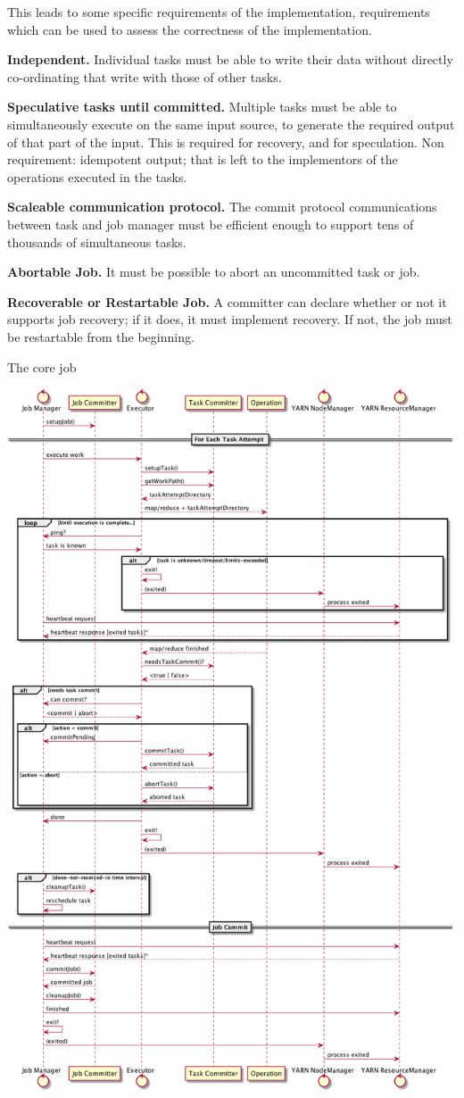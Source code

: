 \documentclass[9pt,technote]{IEEEtran}
\begin{document}
This leads to some specific requirements of the implementation, requirements
which can be used to assess the correctness of the implementation.

\textbf{Independent.}
Individual tasks must be able to write their data without directly
co-ordinating that write with those of other tasks.

\textbf{Speculative tasks until committed.}
Multiple tasks must be able to simultaneously execute on the same input
source, to generate the required output of that part of the input.
This is required for recovery, and for speculation.
Non requirement: idempotent output;
that is left to the implementors of the operations executed in the tasks.

\textbf{Scaleable communication protocol.}
The commit protocol communications between task and job manager
must be efficient enough to support tens of thousands of simultaneous
tasks.

\textbf{Abortable Job.}
It must be possible to abort an uncommitted task or job.

\textbf{Recoverable or Restartable Job.}
A committer can declare whether or not it supports job recovery;
if it does, it must implement recovery.
If not, the job must be restartable from the beginning.

The core job


\includegraphics[width=.8\textwidth]{commit-protocol.png}
\end{document}
